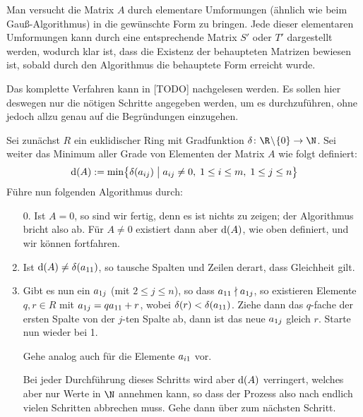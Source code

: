 \begin{proofsketch}
    Man versucht die Matrix $A$ durch elementare Umformungen (ähnlich wie beim
    Gauß-Algorithmus) in die gewünschte Form zu bringen. Jede dieser elementaren
    Umformungen kann durch eine entsprechende Matrix $S'$ oder $T'$ dargestellt
    werden, wodurch klar ist, dass die Existenz der behaupteten Matrizen
    bewiesen ist, sobald durch den Algorithmus die behauptete Form erreicht
    wurde.
    
    Das komplette Verfahren kann in [TODO] %
    nachgelesen werden. Es sollen hier deswegen nur die nötigen Schritte
    angegeben werden, um es durchzuführen, ohne jedoch allzu genau auf die
    Begründungen einzugehen.
    
    Sei zunächst $R$ ein euklidischer Ring mit Gradfunktion
    $\delta\colon\R\!\setminus\!\{0\}\to\N$. %
    Sei weiter das Minimum aller Grade von Elementen der Matrix $A$ wie folgt
    definiert:
    \[ \mathrm{d}(A) := \min\bigl\{ \delta(a_{ij}) \;\big\vert\; a_{ij}\neq0,\;
                            1\leq i\leq m, \; 1\leq j\leq n \bigr\}    \]
    Führe nun folgenden Algorithmus durch:
    \begin{enumerate}[1.]
        \item[0.]
            Ist $A=0$, so sind wir fertig, denn es ist nichts zu zeigen;
            der Algorithmus bricht also ab.
            Für $A\neq0$ existiert dann aber $\mathrm{d}(A)$, wie oben definiert, und
            wir können fortfahren.
            
        \item 
            Ist $\mathrm{d}(A) \neq \delta(a_{11})$, so tausche Spalten und Zeilen
            derart, dass Gleichheit gilt.
            
        \item
            Gibt es nun ein $a_{1j}$ (mit $2\leq j\leq n$), so dass 
            $a_{11} \nmid a_{1j}$, so existieren Elemente $q,r\in R$ mit $a_{1j} =
            qa_{11} + r$, wobei $\delta(r) < \delta(a_{11})$. Ziehe dann das
            $q$-fache der ersten Spalte von der $j$-ten Spalte ab, dann ist das
            neue $a_{1j}$ gleich $r$. Starte nun wieder bei 1.
            
            Gehe analog auch für die Elemente $a_{i1}$ vor.
            
            Bei jeder Durchführung dieses Schritts wird aber $\mathrm{d}(A)$ verringert,
            welches aber nur Werte in $\N$ annehmen kann, so dass der Prozess
            also nach endlich vielen Schritten abbrechen muss. Gehe dann über
            zum nächsten Schritt.
            

\end{enumerate}
\end{proofsketch}
